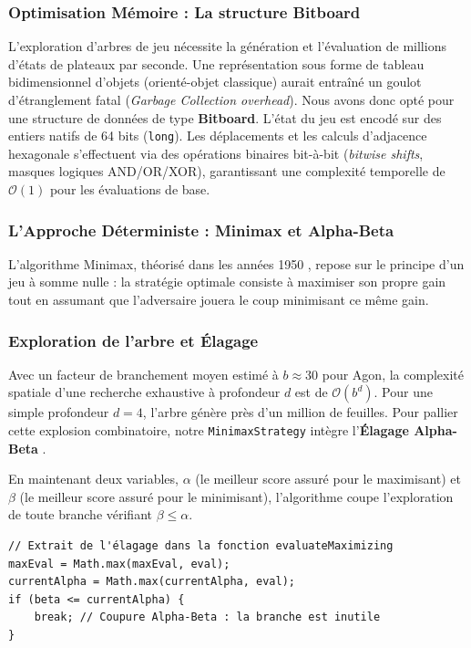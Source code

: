 \documentclass[a4paper]{article}
\begin{document}
\subsubsection{Optimisation Mémoire : La structure Bitboard}
L'exploration d'arbres de jeu nécessite la génération et l'évaluation de millions d'états de plateaux par seconde. Une représentation sous forme de tableau bidimensionnel d'objets (orienté-objet classique) aurait entraîné un goulot d'étranglement fatal (\textit{Garbage Collection overhead}). Nous avons donc opté pour une structure de données de type \textbf{Bitboard}. L'état du jeu est encodé sur des entiers natifs de 64 bits (\texttt{long}). Les déplacements et les calculs d'adjacence hexagonale s'effectuent via des opérations binaires bit-à-bit (\textit{bitwise shifts}, masques logiques AND/OR/XOR), garantissant une complexité temporelle de $\mathcal{O}(1)$ pour les évaluations de base.

\subsubsection{L'Approche Déterministe : Minimax et Alpha-Beta}

L'algorithme Minimax, théorisé dans les années 1950 \cite{shannon1950programming}, repose sur le principe d'un jeu à somme nulle : la stratégie optimale consiste à maximiser son propre gain tout en assumant que l'adversaire jouera le coup minimisant ce même gain.

\subsubsection{Exploration de l'arbre et Élagage}
Avec un facteur de branchement moyen estimé à $b \approx 30$ pour Agon, la complexité spatiale d'une recherche exhaustive à profondeur $d$ est de $\mathcal{O}(b^d)$. Pour une simple profondeur $d=4$, l'arbre génère près d'un million de feuilles. Pour pallier cette explosion combinatoire, notre \texttt{MinimaxStrategy} intègre l'\textbf{Élagage Alpha-Beta} \cite{knuth1975alpha}. 

En maintenant deux variables, $\alpha$ (le meilleur score assuré pour le maximisant) et $\beta$ (le meilleur score assuré pour le minimisant), l'algorithme coupe l'exploration de toute branche vérifiant $\beta \leq \alpha$. 

\begin{verbatim}
// Extrait de l'élagage dans la fonction evaluateMaximizing
maxEval = Math.max(maxEval, eval);
currentAlpha = Math.max(currentAlpha, eval);
if (beta <= currentAlpha) {
    break; // Coupure Alpha-Beta : la branche est inutile
}
\end{verbatim}
\end{document}
